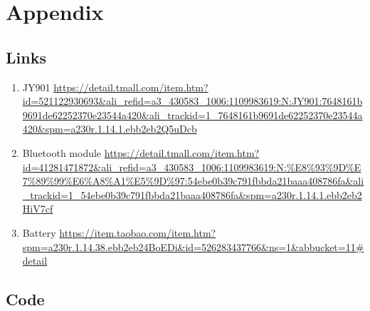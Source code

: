 \section{Appendix}

\subsection{Links}

\begin{enumerate}
\item JY901 
\url{https://detail.tmall.com/item.htm?id=521122930693&ali_refid=a3_430583_1006:1109983619:N:JY901:7648161b9691de62252370e23544a420&ali_trackid=1_7648161b9691de62252370e23544a420&spm=a230r.1.14.1.ebb2eb2Q5uDcb} 

\item  Bluetooth module 
\url{https://detail.tmall.com/item.htm?id=41281471872&ali_refid=a3_430583_1006:1109983619:N:%E8%93%9D%E7%89%99%E6%A8%A1%E5%9D%97:54ebe0b39c791fbbda21baaa408786fa&ali_trackid=1_54ebe0b39c791fbbda21baaa408786fa&spm=a230r.1.14.1.ebb2eb2HiV7cf}
\item  Battery 
\url{https://item.taobao.com/item.htm?spm=a230r.1.14.38.ebb2eb24BoEDi&id=526283437766&ns=1&abbucket=11#detail} 

\end{enumerate}


\subsection{Code}
\inputminted{csharp}{scr/scr1.cs}